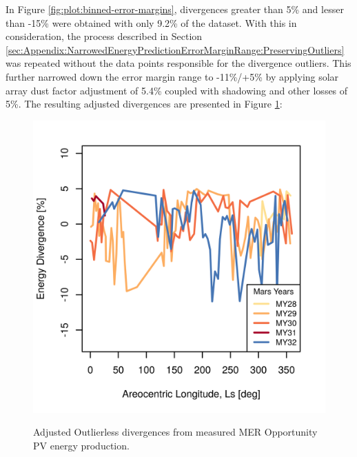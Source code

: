 In Figure \ref{fig:plot:binned-error-margins}, divergences greater than 5\% and lesser than -15\% were obtained with only 9.2\% of the dataset. With this in consideration, the process described in Section \ref{sec:Appendix:NarrowedEnergyPredictionErrorMarginRange:PreservingOutliers} was repeated without the data points responsible for the divergence outliers. This further narrowed down the error margin range to -11\%/+5\% by applying solar array dust factor adjustment of 5.4\% coupled with shadowing and other losses of 5\%. The resulting adjusted divergences are presented in Figure \ref{fig:plot:mer-energy-prediction-divergences-adjusted-without-outliers}:

\begin{figure}[h]
  \centering
  \hypersetup{linkcolor=captionTextColor}
  \includegraphics[width=0.8\linewidth]{sections/appendix/B/plots/energy-prediction-divergences-from-my28-to-my32-adjusted-without-outliers.png}\\
  \caption[Adjusted Outlierless divergences from measured MER Opportunity PV energy production]
          {Adjusted Outlierless divergences from measured MER Opportunity PV energy production.}
  \label{fig:plot:mer-energy-prediction-divergences-adjusted-without-outliers}
\end{figure}
